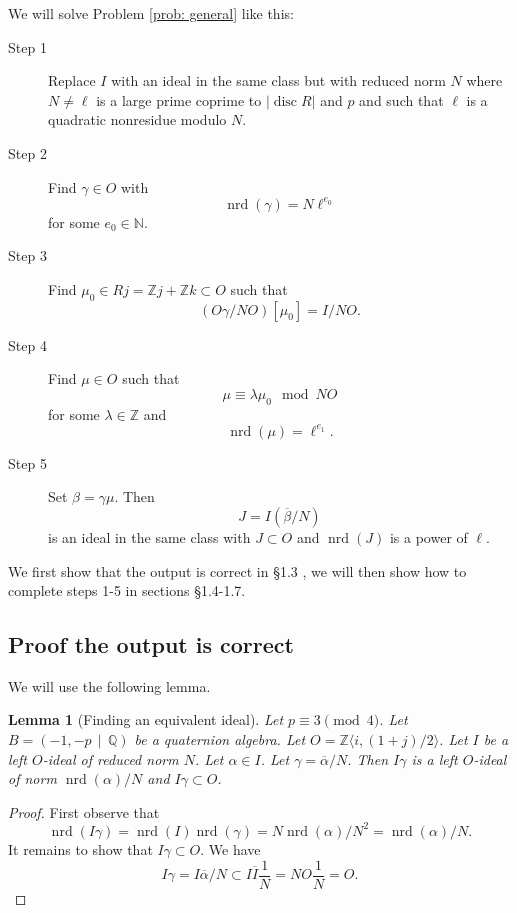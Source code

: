 \documentclass[10pt]{article}
\theoremstyle{plain}
\newtheorem{lemma}[theorem]{Lemma}
\theoremstyle{definition}
\newcommand{\op}{\operatorname}
\newcommand{\N}{\mathbb{N}}
\newcommand{\Z}{\mathbb{Z}}
\newcommand{\Q}{\mathbb{Q}}
\newcommand{\nrd}{\op{nrd}}
\newcommand{\disc}{\op{disc}}
\begin{document}
We will solve Problem \ref{prob: general} like this:

\begin{description}
    \item[Step 1]
    Replace \( I \) with an ideal in the same class but with reduced norm \( N \) where \( N \neq \ell \) is a large prime coprime to \( |\disc R| \) and \( p \) and such that \( \ell \) is a quadratic nonresidue modulo \( N \).

    \item[Step 2]
    Find \( \gamma \in O \) with
    \[
        \nrd(\gamma) = N \ell^{e_0}
    \]
    for some \( e_0 \in \N \).

    \item[Step 3]
    Find \( \mu_0 \in Rj = \Z j + \Z k \subset  O \) such that
    \[
        (O\gamma / NO)[\mu_0] = I / NO .
    \]

    \item[Step 4]
    Find \( \mu \in  O \) such that
    \[
        \mu \equiv \lambda \mu_0 \mod NO
    \]
    for some \( \lambda \in \Z \) and
    \[
        \nrd(\mu) = \ell^{e_1}.
    \]

    \item[Step 5]
    Set \( \beta = \gamma \mu \).
    Then
    \[
        J = I(\overline{\beta}/N)
    \]
    is an ideal in the same class with \( J \subset O \) and \( \nrd(J) \) is a power of \( \ell \).
\end{description}


We first show that the output is correct in \S 1.3 , we will then show how to complete steps 1-5 in sections \S 1.4-1.7.

\subsection{Proof the output is correct}
We will use the following lemma.
\begin{lemma}[Finding an equivalent ideal] \label{lem: change norm}
    Let \( p \equiv 3 \pmod{4} \).
    Let \( B =  (-1, -p \, \mid \, \Q) \) be a quaternion algebra.
    Let \( O = \Z \langle i, (1+j) / 2 \rangle \).
    Let \( I \) be a left \( O \)-ideal of reduced norm \( N \).
    Let \( \alpha \in I \).
    Let \( \gamma = \overline{\alpha} / N \).
    Then \( I \gamma \) is a left \( O \)-ideal of norm \( \nrd(\alpha) / N \) and \( I \gamma \subset O \).
\end{lemma}
\begin{proof}
    First observe that
    \[
        \nrd(I \gamma) = \nrd(I)\nrd(\gamma) = N \nrd(\alpha) / N^2 = \nrd(\alpha) / N.
    \]
    It remains to show that \( I\gamma \subset O \).
    We have
    \[
        I\gamma = I\overline{\alpha} / N \subset I\overline{I} \frac{1}{N} = NO \frac{1}{N} = O.
    \]
\end{proof}
\end{document}
